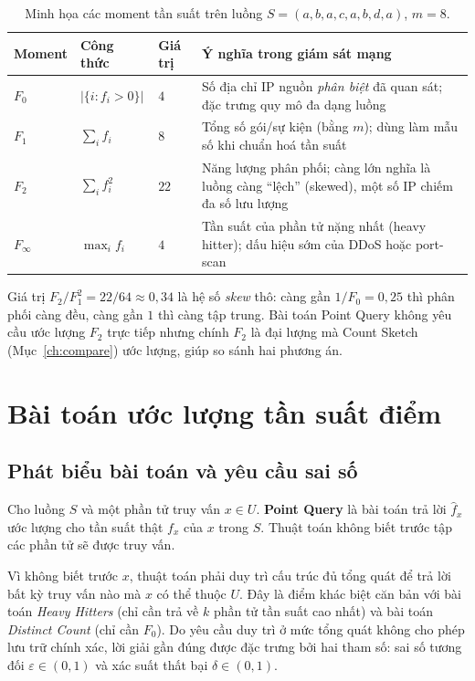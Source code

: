 \begin{table}[H]
  \centering
  \caption{Minh họa các moment tần suất trên luồng $S = (a,b,a,c,a,b,d,a)$, $m=8$.}
  \label{tab:moments-example}
  \small
  \begin{tabularx}{\linewidth}{@{}l l l X@{}}
    \toprule
    \textbf{Moment} & \textbf{Công thức} & \textbf{Giá trị} & \textbf{Ý nghĩa trong giám sát mạng} \\
    \midrule
    $F_0$ & $|\{i : f_i > 0\}|$          & $4$  & Số địa chỉ IP nguồn \textit{phân biệt} đã quan sát; đặc trưng quy mô đa dạng luồng \\
    $F_1$ & $\sum_i f_i$                 & $8$  & Tổng số gói/sự kiện (bằng $m$); dùng làm mẫu số khi chuẩn hoá tần suất \\
    $F_2$ & $\sum_i f_i^2$               & $22$ & Năng lượng phân phối; càng lớn nghĩa là luồng càng ``lệch'' (skewed), một số IP chiếm đa số lưu lượng \\
    $F_\infty$ & $\max_i f_i$            & $4$  & Tần suất của phần tử nặng nhất (heavy hitter); dấu hiệu sớm của DDoS hoặc port-scan \\
    \bottomrule
  \end{tabularx}
\end{table}

Giá trị $F_2 / F_1^2 = 22/64 \approx 0{,}34$ là hệ số \textit{skew} thô: càng gần $1/F_0 = 0{,}25$ thì phân phối càng đều, càng gần $1$ thì càng tập trung. Bài toán Point Query không yêu cầu ước lượng $F_2$ trực tiếp nhưng chính $F_2$ là đại lượng mà Count Sketch (Mục~\ref{ch:compare}) ước lượng, giúp so sánh hai phương án.

\section{Bài toán ước lượng tần suất điểm}

\subsection{Phát biểu bài toán và yêu cầu sai số}

\begin{definition}
\label{def:pointquery}
Cho luồng $S$ và một phần tử truy vấn $x \in U$. \textbf{Point Query} là bài toán trả lời $\hat{f}_x$ ước lượng cho tần suất thật $f_x$ của $x$ trong $S$. Thuật toán không biết trước tập các phần tử sẽ được truy vấn.
\end{definition}

Vì không biết trước $x$, thuật toán phải duy trì cấu trúc đủ tổng quát để trả lời bất kỳ truy vấn nào mà $x$ có thể thuộc $U$. Đây là điểm khác biệt căn bản với bài toán \textit{Heavy Hitters} (chỉ cần trả về $k$ phần tử tần suất cao nhất) và bài toán \textit{Distinct Count} (chỉ cần $F_0$). Do yêu cầu duy trì ở mức tổng quát không cho phép lưu trữ chính xác, lời giải gần đúng được đặc trưng bởi hai tham số: sai số tương đối $\varepsilon \in (0, 1)$ và xác suất thất bại $\delta \in (0, 1)$.

